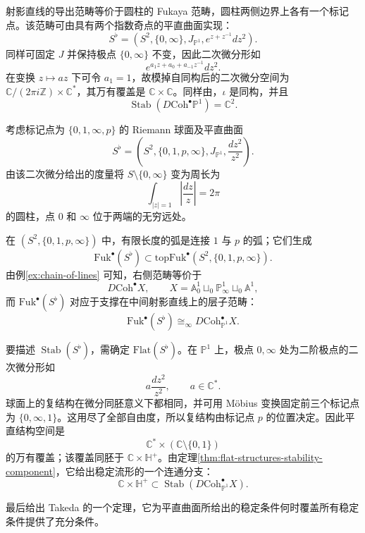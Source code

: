 \begin{example}[射影直线的稳定流形]
射影直线的导出范畴等价于圆柱的 Fukaya 范畴，圆柱两侧边界上各有一个标记点。该范畴可由具有两个指数奇点的平直曲面实现：
\[
  S^{\flat}=(S^2,\{0,\infty\},J_{\mathbb P^1},e^{z+z^{-1}}dz^2).
\]
同样可固定 $J$ 并保持极点 $\{0,\infty\}$ 不变，因此二次微分形如
\[
  e^{a_1z+a_0+a_{-1}z^{-1}}dz^2.
\]
在变换 $z\mapsto az$ 下可令 $a_1=1$，故模掉自同构后的二次微分空间为 $\mathbb C/(2\pi i\mathbb Z)\times\mathbb C^*$，其万有覆盖是 $\mathbb C\times\mathbb C$。同样由，$\iota$ 是同构，并且
\[
  \operatorname{Stab}(D\mathrm{Coh}^{\bullet}\mathbb P^1)=\mathbb C^2.
\]
\end{example}

\begin{example}[四标记球面上的稳定条件]
考虑标记点为 $\{0,1,\infty,p\}$ 的 Riemann 球面及平直曲面
\[
  S^{\flat}=\left(S^2,\{0,1,p,\infty\},J_{\mathbb P^1},\frac{dz^2}{z^2}\right).
\]
由该二次微分给出的度量将 $S\setminus\{0,\infty\}$ 变为周长为
\[
  \int_{|z|=1}\left|\frac{dz}{z}\right|=2\pi
\]
的圆柱，点 $0$ 和 $\infty$ 位于两端的无穷远处。

在 $(S^2,\{0,1,p,\infty\})$ 中，有限长度的弧是连接 $1$ 与 $p$ 的弧；它们生成
\[
  \mathrm{Fuk}^{\bullet}(S^{\flat})
  \subset\mathrm{topFuk}^{\bullet}(S^2,\{0,1,p,\infty\}).
\]
由例\ref{ex:chain-of-lines} 可知，右侧范畴等价于
\[
  D\mathrm{Coh}^{\bullet}X,\qquad
  X=\mathbb A^1_0\sqcup_0\mathbb P^1_\infty\sqcup_0\mathbb A^1,
\]
而 $\mathrm{Fuk}^{\bullet}(S^{\flat})$ 对应于支撑在中间射影直线上的层子范畴：
\[
  \mathrm{Fuk}^{\bullet}(S^{\flat})
  \cong_\infty D\mathrm{Coh}^{\bullet}_{\mathbb P^1}X.
\]

要描述 $\operatorname{Stab}(S^{\flat})$，需确定 $\mathrm{Flat}(S^{\flat})$。在 $\mathbb P^1$ 上，极点 $0,\infty$ 处为二阶极点的二次微分形如
\[
  a\frac{dz^2}{z^2},\qquad a\in\mathbb C^*.
\]
球面上的复结构在微分同胚意义下都相同，并可用 Möbius 变换固定前三个标记点为 $\{0,\infty,1\}$。这用尽了全部自由度，所以复结构由标记点 $p$ 的位置决定。因此平直结构空间是
\[
  \mathbb C^*\times(\mathbb C\setminus\{0,1\})
\]
的万有覆盖；该覆盖同胚于 $\mathbb C\times\mathbb H^+$。由定理\ref{thm:flat-structures-stability-component}，它给出稳定流形的一个连通分支：
\[
  \mathbb C\times\mathbb H^+
  \subset\operatorname{Stab}(D\mathrm{Coh}^{\bullet}_{\mathbb P^1}X).
\]
\end{example}

最后给出 Takeda 的一个定理，它为平直曲面所给出的稳定条件何时覆盖所有稳定条件提供了充分条件。

